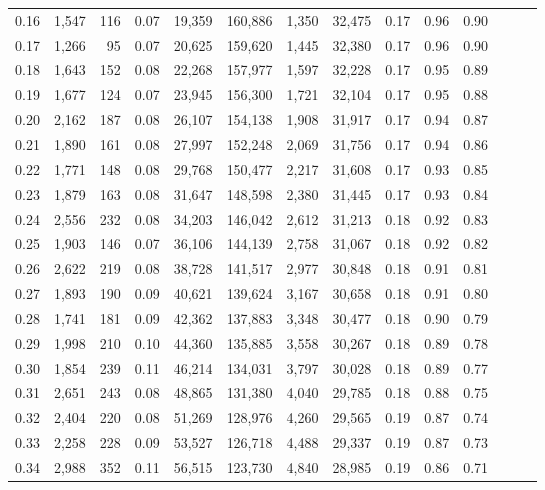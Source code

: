 \begin{tabular}{rrrrrrrrrrrrrr}
0.16 &  1,547 &  116 &  0.07 &   19,359 &  160,886 &   1,350 &  32,475 &  0.17 &  0.96 &      0.90 \\
0.17 &  1,266 &   95 &  0.07 &   20,625 &  159,620 &   1,445 &  32,380 &  0.17 &  0.96 &      0.90 \\
0.18 &  1,643 &  152 &  0.08 &   22,268 &  157,977 &   1,597 &  32,228 &  0.17 &  0.95 &      0.89 \\
0.19 &  1,677 &  124 &  0.07 &   23,945 &  156,300 &   1,721 &  32,104 &  0.17 &  0.95 &      0.88 \\
0.20 &  2,162 &  187 &  0.08 &   26,107 &  154,138 &   1,908 &  31,917 &  0.17 &  0.94 &      0.87 \\
0.21 &  1,890 &  161 &  0.08 &   27,997 &  152,248 &   2,069 &  31,756 &  0.17 &  0.94 &      0.86 \\
0.22 &  1,771 &  148 &  0.08 &   29,768 &  150,477 &   2,217 &  31,608 &  0.17 &  0.93 &      0.85 \\
0.23 &  1,879 &  163 &  0.08 &   31,647 &  148,598 &   2,380 &  31,445 &  0.17 &  0.93 &      0.84 \\
0.24 &  2,556 &  232 &  0.08 &   34,203 &  146,042 &   2,612 &  31,213 &  0.18 &  0.92 &      0.83 \\
0.25 &  1,903 &  146 &  0.07 &   36,106 &  144,139 &   2,758 &  31,067 &  0.18 &  0.92 &      0.82 \\
0.26 &  2,622 &  219 &  0.08 &   38,728 &  141,517 &   2,977 &  30,848 &  0.18 &  0.91 &      0.81 \\
0.27 &  1,893 &  190 &  0.09 &   40,621 &  139,624 &   3,167 &  30,658 &  0.18 &  0.91 &      0.80 \\
0.28 &  1,741 &  181 &  0.09 &   42,362 &  137,883 &   3,348 &  30,477 &  0.18 &  0.90 &      0.79 \\
0.29 &  1,998 &  210 &  0.10 &   44,360 &  135,885 &   3,558 &  30,267 &  0.18 &  0.89 &      0.78 \\
0.30 &  1,854 &  239 &  0.11 &   46,214 &  134,031 &   3,797 &  30,028 &  0.18 &  0.89 &      0.77 \\
0.31 &  2,651 &  243 &  0.08 &   48,865 &  131,380 &   4,040 &  29,785 &  0.18 &  0.88 &      0.75 \\
0.32 &  2,404 &  220 &  0.08 &   51,269 &  128,976 &   4,260 &  29,565 &  0.19 &  0.87 &      0.74 \\
0.33 &  2,258 &  228 &  0.09 &   53,527 &  126,718 &   4,488 &  29,337 &  0.19 &  0.87 &      0.73 \\
0.34 &  2,988 &  352 &  0.11 &   56,515 &  123,730 &   4,840 &  28,985 &  0.19 &  0.86 &      0.71 \\

\end{tabular}
